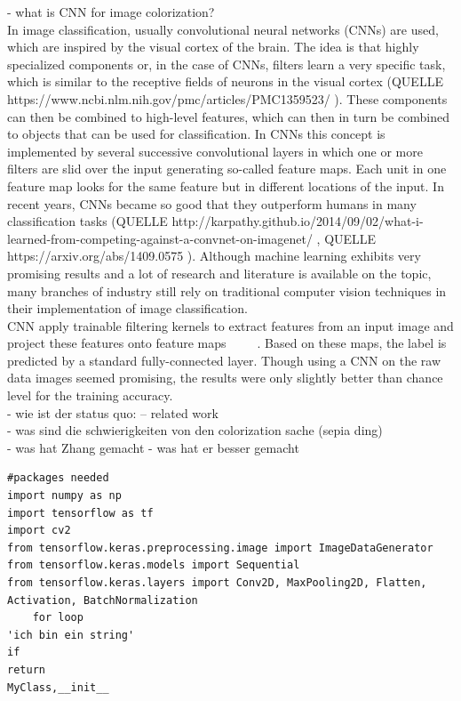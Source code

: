 \documentclass[12pt,letterpaper]{article}
\begin{document}
- what is CNN for image colorization?\\
In image classification, usually convolutional neural networks (CNNs) are used, which are inspired by the visual cortex of the brain. The idea is that highly specialized components or, in the case of CNNs, filters learn a very specific task, which is similar to the receptive fields of neurons in the visual cortex (QUELLE https://www.ncbi.nlm.nih.gov/pmc/articles/PMC1359523/ ). These components can then be combined to high-level features, which can then in turn be combined to objects that can be used for classification. In CNNs this concept is implemented by several successive convolutional layers in which one or more filters are slid over the input generating so-called feature maps. Each unit in one feature map looks for the same feature but in different locations of the input. In recent years, CNNs became so good that they outperform humans in many classification tasks (QUELLE http://karpathy.github.io/2014/09/02/what-i-learned-from-competing-against-a-convnet-on-imagenet/ , QUELLE https://arxiv.org/abs/1409.0575 ). Although machine learning exhibits very promising results and a lot of research and literature is available on the topic, many branches of industry still rely on traditional computer vision techniques in their implementation of image classification.\\

CNN apply trainable filtering kernels to extract features from an input image and project these features onto feature maps ~\citep{geron2019hands} ~\citep{bishop2006pattern} ~\citep{lecun1995convolutional}. Based on these maps, the label is predicted by a standard fully-connected layer.
Though using a CNN on the raw data images seemed promising, the results were only slightly better than chance level for the training accuracy.\\

- wie ist der status quo: -- related work\\
- was sind die schwierigkeiten von den colorization sache (sepia ding)\\
- was hat Zhang gemacht - was hat er besser gemacht\\

\begin{lstlisting}
#packages needed
import numpy as np 
import tensorflow as tf 
import cv2
from tensorflow.keras.preprocessing.image import ImageDataGenerator
from tensorflow.keras.models import Sequential
from tensorflow.keras.layers import Conv2D, MaxPooling2D, Flatten, Activation, BatchNormalization
	for loop
'ich bin ein string'
if
return
MyClass,__init__
\end{lstlisting}
\end{document}
